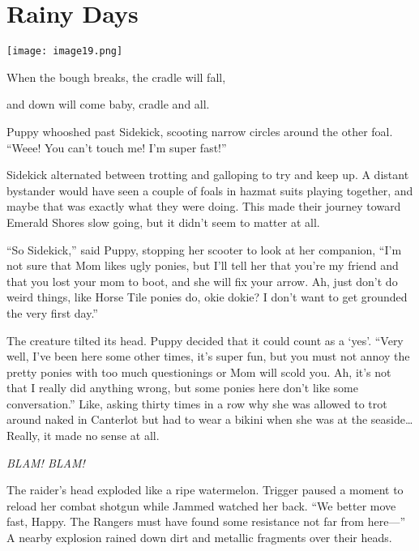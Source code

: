 
\chapter{Rainy Days}

\texttt{[image: image19.png]}

\begin{intro}
When the bough breaks, the cradle will fall,

and down will come baby, cradle and all.
\end{intro}



Puppy whooshed past Sidekick, scooting narrow circles around the other foal. ``Weee! You can't touch me! I'm super fast!''

Sidekick alternated between trotting and galloping to try and keep up. A distant bystander would have seen a couple of foals in hazmat suits playing together, and maybe that was exactly what they were doing. This made their journey toward Emerald Shores slow going, but it didn't seem to matter at all.

``So Sidekick,'' said Puppy, stopping her scooter to look at her companion, ``I'm not sure that Mom likes ugly ponies, but I'll tell her that you're my friend and that you lost your mom to boot, and she will fix your arrow. Ah, just don't do weird things, like Horse Tile ponies do, okie dokie? I don't want to get grounded the very first day.''

The creature tilted its head. Puppy decided that it could count as a `yes'. ``Very well, I've been here some other times, it's super fun, but you must not annoy the pretty ponies with too much questionings or Mom will scold you. Ah, it's not that I really did anything wrong, but some ponies here don't like some conversation.'' Like, asking thirty times in a row why she was allowed to trot around naked in Canterlot but had to wear a bikini when she was at the seaside\dots Really, it made no sense at all.



\horizonline


\emph{BLAM! BLAM!}

The raider's head exploded like a ripe watermelon. Trigger paused a moment to reload her combat shotgun while Jammed watched her back. ``We better move fast, Happy. The Rangers must have found some resistance not far from here---'' A nearby explosion rained down dirt and metallic fragments over their heads.

